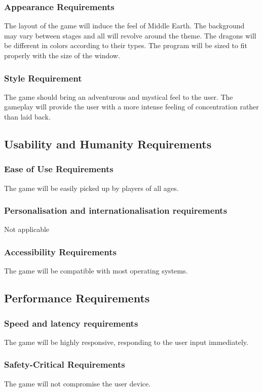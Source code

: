 \documentclass{article}
\begin{document}
\subsubsection{Appearance Requirements}
The layout of the game will induce the feel of Middle Earth. The background may vary between stages and all will revolve around the theme. The dragons will be different in colors according to their types. The program will be sized to fit properly with the size of the window.
\subsubsection{Style Requirement}
The game should bring an adventurous and mystical feel to the user. The gameplay will provide the user with a more intense feeling of concentration rather than laid back.

\subsection{Usability and Humanity Requirements}
\subsubsection{Ease of Use Requirements}
The game will be easily picked up by players of all ages.
\subsubsection{Personalisation and internationalisation requirements}
Not applicable
\subsubsection{Accessibility Requirements}
The game will be compatible with most operating systems.

\subsection{Performance Requirements}
\subsubsection{Speed and latency requirements}
The game will be highly responsive, responding to the user input immediately.
\subsubsection{Safety-Critical Requirements}
The game will not compromise the user device.
\end{document}
